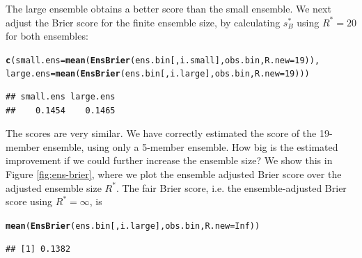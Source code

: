 \documentclass[article]{jss}\usepackage{graphicx, color}
\makeatletter
\newcommand{\hlfunctioncall}[1]{\textcolor[rgb]{0,0.501960784313725,0.752941176470588}{\textbf{#1}}}%
\newenvironment{kframe}{%
 \def\at@end@of@kframe{}%
 \ifinner\ifhmode%
  \def\at@end@of@kframe{\end{minipage}}%
  \begin{minipage}{\columnwidth}%
 \fi\fi%
 \def\FrameCommand##1{\hskip\@totalleftmargin \hskip-\fboxsep
 \colorbox{shadecolor}{##1}\hskip-\fboxsep
     \hskip-\linewidth \hskip-\@totalleftmargin \hskip\columnwidth}%
 \MakeFramed {\advance\hsize-\width
   \@totalleftmargin\z@ \linewidth\hsize
   \@setminipage}}%
 {\par\unskip\endMakeFramed%
 \at@end@of@kframe}
\newenvironment{knitrout}{}{} %
\makeatother
\begin{document}
The large ensemble obtains a better score than the small ensemble.
We next adjust the Brier score for the finite ensemble size, by calculating $s_{B}^*$ using $R^*=20$ for both ensembles:

\begin{knitrout}
\color{fgcolor}\begin{kframe}
\begin{alltt}
\hlfunctioncall{c}(small.ens=\hlfunctioncall{mean}(\hlfunctioncall{EnsBrier}(ens.bin[, i.small], obs.bin, R.new=19)), 
  large.ens=\hlfunctioncall{mean}(\hlfunctioncall{EnsBrier}(ens.bin[, i.large], obs.bin, R.new=19)))
\end{alltt}
\begin{verbatim}
## small.ens large.ens 
##    0.1454    0.1465
\end{verbatim}
\end{kframe}
\end{knitrout}


The scores are very similar. 
We have correctly estimated the score of the 19-member ensemble, using only a 5-member ensemble.
How big is the estimated improvement if we could further increase the ensemble size?
We show this in Figure \ref{fig:ens-brier}, where we plot the ensemble adjusted Brier score over the adjusted ensemble size $R^*$.
The fair Brier score, i.e. the ensemble-adjusted Brier score using $R^*=\infty$, is
%
\begin{knitrout}
\color{fgcolor}\begin{kframe}
\begin{alltt}
\hlfunctioncall{mean}(\hlfunctioncall{EnsBrier}(ens.bin[, i.large], obs.bin, R.new=Inf))
\end{alltt}
\begin{verbatim}
## [1] 0.1382
\end{verbatim}
\end{kframe}
\end{knitrout}

%
\end{document}
